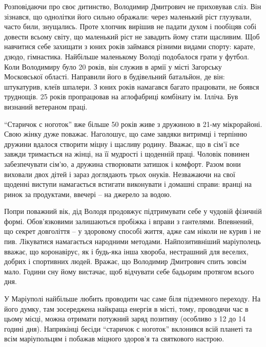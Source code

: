 
Розповідаючи про своє дитинство, Володимир Дмитрович не приховував сліз. Він
зізнався, що однолітки його сильно ображали: через маленький ріст глузували,
часто били, знущались. Проте хлопчик вирішив не падати духом і пообіцяв собі
довести всьому світу, що маленький ріст не завадить йому стати щасливим. Щоб
навчитися себе захищати з юних років займався різними видами спорту: карате,
дзюдо, гімнастика. Найбільше маленькому Володі подобалося грати у футбол. Коли
Володимиру було 20 років, він служив в армії у місті Загорську Московської
області. Направили його в будівельний батальйон, де він: штукатурив, клеїв
шпалери. З юних років намагався багато працювати, не боявся труднощів. 25 років
пропрацював на аглофабриці комбінату ім. Ілліча. Був визнаний ветераном праці.

\enquote{Старичок с ноготок} вже більше 50 років живе з дружиною в 21-му мікрорайоні.
Свою жінку дуже поважає. Наголошує, що саме завдяки витримці і терпінню дружини
вдалося створити міцну і щасливу родину. Вважає, що в сім'ї все завжди
тримається на жінці, на її мудрості і щоденній праці. Чоловік повинен
забезпечувати сім'ю, а дружина створювати затишок і комфорт. Разом вони
виховали двох дітей і зараз доглядають трьох онуків. Незважаючи на свої щоденні
виступи намагається встигати виконувати і домашні справи: вранці на ринок за
продуктами, ввечері – на джерело за водою.

Попри поважний вік, дід Володя продовжує підтримувати себе у чудовій фізичній
формі. Обов'язковими залишаються пробіжка і вправи з гантелями. Впевнений, що
секрет довголіття – у здоровому способі життя, адже сам ніколи не курив і не
пив. Лікуватися намагається народними методами. Найпозитивніший маріуполець
вважає, що коронавірус, як і будь-яка інша хвороба, нестрашний для веселих,
добрих і спортивних людей. Вражає, що Володимир Дмитрович спить зовсім мало.
Години сну йому вистачає, щоб відчувати себе бадьорим протягом всього дня.

У Маріуполі найбільше любить проводити час саме біля підземного переходу. На
його думку, там зосереджена найкраща енергія в місті, тому, проводячи час в
цьому місці, можна отримати потужний заряд позитиву (особливо з 12 до 14 годині
дня). Наприкінці бесіди \enquote{старичок с ноготок} вклонився всій планеті та всім
маріупольцям і побажав міцного здоров'я та святкового настрою.

